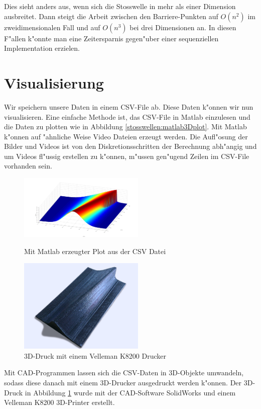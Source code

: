 \begin{refsection}
Dies sieht anders aus, wenn sich die Stosswelle in mehr als einer
Dimension ausbreitet. Dann steigt die Arbeit zwischen den Barriere-Punkten
auf $O(n^{2})$ im zweidimensionalen Fall und auf $O(n^{3})$ bei drei
Dimensionen an. In diesen F"allen k"onnte man eine Zeitersparnis
gegen"uber einer sequenziellen Implementation erzielen.

\section{Visualisierung}
Wir speichern unsere Daten in einem CSV-File ab. Diese Daten k"onnen
wir nun visualisieren. Eine einfache Methode ist, das CSV-File
in Matlab einzulesen und die Daten zu plotten wie in Abbildung
\ref{stosswellen:matlab3Dplot}. Mit Matlab k"onnen auf "ahnliche Weise
Video Dateien erzeugt werden. Die Aufl"osung der Bilder und Videos ist
von den Diskretionsschritten der Berechnung abh"angig und um Videos
fl"ussig erstellen zu k"onnen, m"ussen gen"ugend Zeilen im CSV-File
vorhanden sein. 
\begin{figure}
\begin{minipage}{0.45\textwidth}
	\includegraphics[width=6cm]{stosswellen/Matlab_3DPlot.jpg}
	\caption{Mit Matlab erzeugter Plot aus der CSV Datei}
\label{stosswellen:matlab3Dplot}
\end{minipage}
\hfill
\begin{minipage}{0.45\textwidth}
	\includegraphics[width=6cm]{stosswellen/3D_print.PNG}
	\caption{3D-Druck mit einem Velleman K8200 Drucker}
	\label{stosswellen:3Dprint}
\end{minipage}
\end{figure}

Mit CAD-Programmen lassen sich die CSV-Daten in 3D-Objekte umwandeln,
sodass diese danach mit einem 3D-Drucker ausgedruckt werden k"onnen. Der
3D-Druck in Abbildung \ref{stosswellen:3Dprint} wurde mit der CAD-Software
SolidWorks und einem Velleman K8200 3D-Printer erstellt. 


\end{refsection}
